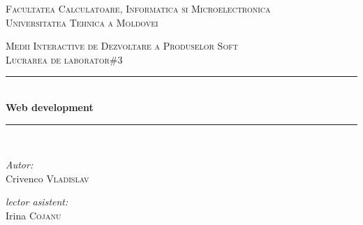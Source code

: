\documentclass[a4paper, 12pt]{article}
\begin{document}
\begin{titlepage}

	\begin{center}
	\textsc{\large Facultatea Calculatoare, Informatica si Microelectronica}\\[0.5cm]
	\textsc{\large Universitatea Tehnica a Moldovei}\\[1.2cm]
	\vspace{25mm}

	\textsc{\Large Medii Interactive de Dezvoltare a Produselor Soft}\\[0.5cm]
  	\textsc{\large Lucrarea de laborator\#3}\\[0.5cm] 

	\newcommand{\HRule}{\rule{\linewidth}{0.5mm}} 
	\vspace{10 mm}

  	\HRule \\[0.4cm]

 	 { \LARGE \bfseries Web development  }\\[0.4cm] 

  	\HRule \\[1.5cm]

	\vspace{30mm}

	\begin{minipage}{0.4\textwidth}
	\begin{flushleft} \large
	\emph{Autor:} \\
	Crivenco \textsc{Vladislav}\\
	\end{flushleft}
	\end{minipage}
      	\begin{minipage}{0.4\textwidth}

      	\begin{flushright} \large

      	\emph{lector asistent:} \\

      	Irina \textsc{Cojanu} \\ %

     	 \end{flushright}

      	\end{minipage}\\[4cm]



     	\vspace{5 mm}

	\vfill

	\end{center}

\end{titlepage}
\end{document}
